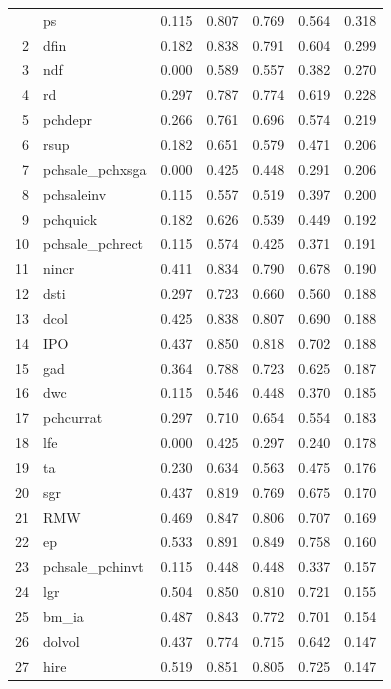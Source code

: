 \documentclass[12pt]{article}
\begin{document}
\begin{footnotesize}
\begin{longtable}{rl|c|c|c|c|c}
		\hline
		\hline
		\endfoot
		1 & ps & 0.115 & 0.807 & 0.769 & 0.564 & 0.318 \\ 
		2 & dfin & 0.182 & 0.838 & 0.791 & 0.604 & 0.299 \\ 
		3 & ndf & 0.000 & 0.589 & 0.557 & 0.382 & 0.270 \\ 
		4 & rd & 0.297 & 0.787 & 0.774 & 0.619 & 0.228 \\ 
		5 & pchdepr & 0.266 & 0.761 & 0.696 & 0.574 & 0.219 \\ 
		6 & rsup & 0.182 & 0.651 & 0.579 & 0.471 & 0.206 \\ 
		7 & pchsale\_pchxsga & 0.000 & 0.425 & 0.448 & 0.291 & 0.206 \\ 
		8 & pchsaleinv & 0.115 & 0.557 & 0.519 & 0.397 & 0.200 \\ 
		9 & pchquick & 0.182 & 0.626 & 0.539 & 0.449 & 0.192 \\ 
		10 & pchsale\_pchrect & 0.115 & 0.574 & 0.425 & 0.371 & 0.191 \\ 
		11 & nincr & 0.411 & 0.834 & 0.790 & 0.678 & 0.190 \\ 
		12 & dsti & 0.297 & 0.723 & 0.660 & 0.560 & 0.188 \\ 
		13 & dcol & 0.425 & 0.838 & 0.807 & 0.690 & 0.188 \\ 
		14 & IPO & 0.437 & 0.850 & 0.818 & 0.702 & 0.188 \\ 
		15 & gad & 0.364 & 0.788 & 0.723 & 0.625 & 0.187 \\ 
		16 & dwc & 0.115 & 0.546 & 0.448 & 0.370 & 0.185 \\ 
		17 & pchcurrat & 0.297 & 0.710 & 0.654 & 0.554 & 0.183 \\ 
		18 & lfe & 0.000 & 0.425 & 0.297 & 0.240 & 0.178 \\ 
		19 & ta & 0.230 & 0.634 & 0.563 & 0.475 & 0.176 \\ 
		20 & sgr & 0.437 & 0.819 & 0.769 & 0.675 & 0.170 \\ 
		21 & RMW & 0.469 & 0.847 & 0.806 & 0.707 & 0.169 \\ 
		22 & ep & 0.533 & 0.891 & 0.849 & 0.758 & 0.160 \\ 
		23 & pchsale\_pchinvt & 0.115 & 0.448 & 0.448 & 0.337 & 0.157 \\ 
		24 & lgr & 0.504 & 0.850 & 0.810 & 0.721 & 0.155 \\ 
		25 & bm\_ia & 0.487 & 0.843 & 0.772 & 0.701 & 0.154 \\ 
		26 & dolvol & 0.437 & 0.774 & 0.715 & 0.642 & 0.147 \\ 
		27 & hire & 0.519 & 0.851 & 0.805 & 0.725 & 0.147 \\ 

\end{longtable}
\end{footnotesize}
\end{document}
